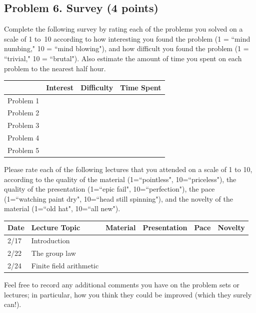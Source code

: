 \documentclass[11pt]{article}
\begin{document}
\subsection*{Problem 6. Survey (4 points)}
Complete the following survey by rating each of the problems you solved on a scale of 1 to~10 according to how interesting you found the problem (1 = ``mind numbing," 10 = ``mind blowing"), and how difficult you found the problem (1 = ``trivial," 10 = ``brutal").  Also estimate the amount of time you spent on each problem to the nearest half hour.

\begin{center}
\begin{tabular}{l|r|r|r|}
& Interest & Difficulty & Time Spent\\\hline
Problem 1 & & & \\\hline
Problem 2 & & & \\\hline
Problem 3 & & & \\\hline
Problem 4 & & & \\\hline
Problem 5 & & & \\\hline
\end{tabular}
\end{center}
\noindent
Please rate each of the following lectures that you attended on a scale of 1 to 10, according to the quality of the material (1=``pointless", 10=``priceless"), the quality of the presentation (1=``epic fail", 10=``perfection"), the pace (1=``watching paint dry", 10=``head still spinning"), and the novelty of the material (1=``old hat", 10=``all new").

\begin{center}
\begin{tabular}{l|l|r|r|r|r|}
Date & Lecture Topic & Material & Presentation & Pace & Novelty\\\hline
2/17 & Introduction & & & &\\\hline 
2/22 & The group law & & & &\\\hline 
2/24 & Finite field arithmetic & & & &\\\hline 
\end{tabular}
\end{center}

\noindent
Feel free to record any additional comments you have on the problem sets or lectures; in particular, how you think they could be improved (which they surely can!).
\end{document}
